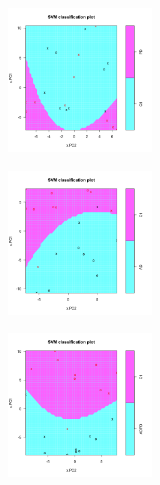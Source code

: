 \begin{figure}[H]
\begin{subfigure}[b]{0.33\linewidth}
\centering
\includegraphics[width=1.5in]{./Figures/fig4/Fig4a-Anterior-Cingulate-Gyrus_CtlvsPD.png}
\end{subfigure}%
\begin{subfigure}[b]{0.33\linewidth}
\centering
\includegraphics[width=1.5in]{./Figures/fig4/Fig4b-Anterior-Cingulate-Gyrus_CtlvsAD.png}
\end{subfigure}%
\begin{subfigure}[b]{0.33\linewidth}
\centering
\includegraphics[width=1.5in]{./Figures/fig4/Fig4c-Anterior-Cingulate-Gyrus_CtlvsADPD.png}
\end{subfigure}


\end{figure}
